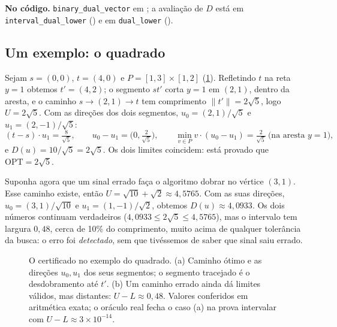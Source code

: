 \documentclass[11pt,a4paper]{article}
\theoremstyle{plain}\newtheorem{proposicao}{Proposição}
\theoremstyle{definition}\newtheorem{definicao}{Definição}
\theoremstyle{plain}\newtheorem{teorema}{Teorema}
\newcommand{\norm}[1]{\lVert#1\rVert}
\newcommand{\OPT}{\mathrm{OPT}}
\newcommand{\code}[1]{\texttt{\small #1}}
\begin{document}
\begin{fonte}
\textbf{No código.} \code{binary\_dual\_vector} em ; a avaliação de \(D\) está em \code{interval\_dual\_lower} () e em \code{dual\_lower} ().
\end{fonte}

\subsection{Um exemplo: o quadrado}\label{sec:exquadrado}
Sejam \(s=(0,0)\), \(t=(4,0)\) e \(P=[1,3]\times[1,2]\) (\cref{fig:quadrado}). Refletindo \(t\) na reta \(y=1\) obtemos \(t'=(4,2)\); o segmento \(st'\) corta \(y=1\) em \((2,1)\), dentro da aresta, e o caminho \(s\to(2,1)\to t\) tem comprimento \(\norm{t'}=2\sqrt5\), logo \(U=2\sqrt5\). Com as direções dos dois segmentos, \(u_0=(2,1)/\sqrt5\) e \(u_1=(2,-1)/\sqrt5\):
\[
(t-s)\cdot u_1=\tfrac{8}{\sqrt5},\qquad u_0-u_1=\bigl(0,\tfrac{2}{\sqrt5}\bigr),\qquad
\min_{v\in P}v\cdot(u_0-u_1)=\tfrac{2}{\sqrt5}\ \text{(na aresta }y=1\text{)},
\]
e \(D(u)=10/\sqrt5=2\sqrt5\). Os dois limites coincidem: está provado que \(\OPT=2\sqrt5\).

Suponha agora que um sinal errado faça o algoritmo dobrar no vértice \((3,1)\). Esse caminho existe, então \(U=\sqrt{10}+\sqrt2\approx4{,}5765\). Com as suas direções, \(u_0=(3,1)/\sqrt{10}\) e \(u_1=(1,-1)/\sqrt2\), obtemos \(D(u)\approx4{,}0933\). Os dois números continuam verdadeiros (\(4{,}0933\le2\sqrt5\le4{,}5765\)), mas o intervalo tem largura \(0{,}48\), cerca de 10\% do comprimento, muito acima de qualquer tolerância da busca: o erro foi \emph{detectado}, sem que tivéssemos de saber que sinal saiu errado.

\begin{figure}[ht]\centering\figquadrado
\caption{O certificado no exemplo do quadrado. (a) Caminho ótimo e as direções \(u_0,u_1\) dos seus segmentos; o segmento tracejado é o desdobramento até \(t'\). (b) Um caminho errado ainda dá limites válidos, mas distantes: \(U-L\approx0{,}48\). Valores conferidos em aritmética exata; o oráculo real fecha o caso (a) na prova intervalar com \(U-L\approx3\times10^{-14}\).}\label{fig:quadrado}
\end{figure}
\end{document}
